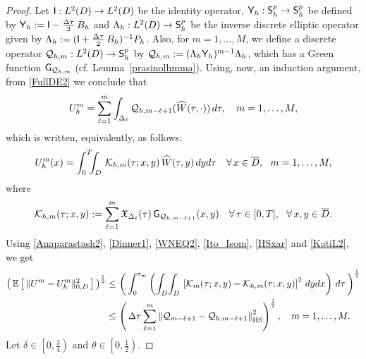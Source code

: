 \documentclass[10pt]{amsart}
\numberwithin{equation}{section}
\begin{document}
\begin{proof}
Let ${\sf I}:L^2(D)\to L^2(D)$ be the identity operator,
${\sf Y}_h:{\sf S}_h^p\rightarrow{\sf S}_h^p$ be defined
by ${\sf Y}_h:={\sf I}-\tfrac{\Delta\tau}{2}\,B_h$
and $\Lambda_h:L^2(D)\to{\sf S}^p_h$ be the inverse discrete elliptic
operator given by $\Lambda_h:=({\sf I}+\tfrac{\Delta\tau}{2}\,B_h)^{-1}P_h$.
Also, for $m=1,\dots,M$, we define a discrete operator
${\mathcal Q}_{h,m}:L^2(D)\rightarrow{\sf S}_h^p$ by
${\mathcal Q}_{h,m}:=(\Lambda_h{\sf Y}_h)^{m-1}\Lambda_h$,
which has a Green function ${\sf G}_{{\mathcal Q}_{h,m}}$ (cf.
Lemma~\ref{prasinolhmma}).
Using, now, an induction argument, from \eqref{FullDE2} we
conclude that
\begin{equation*}
U_h^m=\sum_{\ell=1}^{{\scriptscriptstyle} m} \int_{{\scriptscriptstyle}\Delta_{\ell}}
{\mathcal Q}_{h,m-\ell+1}({\widehat W}(\tau,\cdot))\,d\tau,
\quad m=1,\dots,M,
\end{equation*}
which is written, equivalently, as follows:
\begin{equation}\label{Anaparastash2}
U_h^m(x)=\int_0^{{\scriptscriptstyle} T}\!\!\!\int_{{\scriptscriptstyle} D}
\,{\mathcal K}_{h,m}(\tau;x,y)\,{\widehat W}(\tau,y)
\,dyd\tau\quad\forall\,x\in{\overline D}, {\ \ } m=1,\dots,M,
\end{equation}
where
\begin{equation*}
{\mathcal K}_{h,m}(\tau;x,y)
:=\sum_{\ell=1}^m{\mathfrak X}_{{\scriptscriptstyle}\Delta_{\ell}}(\tau)
\,{\sf G}_{{\mathcal Q}_{h,m-\ell+1}}(x,y)\quad\forall
\,\tau\in[0,T],{\ \ }\forall\,x,y\in{\overline D}.
\end{equation*}
Using \eqref{Anaparastash2}, \eqref{Dinner1}, \eqref{WNEQ2}, \eqref{Ito_Isom},
\eqref{HSxar} and \eqref{KatiL2}, we get
\begin{equation*}
\begin{split}
\left(\,{\mathbb E}\left[\,\|U^{m}-U_h^{m}\|_{{\scriptscriptstyle} 0,D}^2\,\right]\,\right)^{\frac{1}{2}}
\leq&\,\left(\,\int_0^{\tau_m}\left(\int_{{\scriptscriptstyle} D}\!\int_{{\scriptscriptstyle} D}
\,\left[{\mathcal K}_{m}(\tau;x,y)
-{\mathcal K}_{h,m}(\tau;x,y)\right]^2
\,dydx\right)\,d\tau\,\right)^{\frac{1}{2}}\\
\leq&\,\left(\,{\Delta\tau}\sum_{\ell=1}^{m}
\left\|{\mathcal Q}_{m-\ell+1}
-{\mathcal Q}_{h,m-\ell+1}\right\|_{{\scriptscriptstyle}\rm HS}^2\right)^{\frac{1}{2}},
\quad m=1,\dots,M.\\
\end{split}
\end{equation*}
Let $\delta\in\left[0,\tfrac{3}{4}\right)$ and $\theta\in\left[0,\frac{1}{2}\right)$.

\end{proof}
\end{document}

